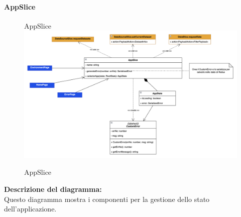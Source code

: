 \paragraph{AppSlice}
\begin{figure}[h!] \centering
AppSlice      \includegraphics[scale=0.4]{template/images/uml_front/logic/AppSlice.png}
      \caption{AppSlice}
\end{figure}
\textbf{Descrizione del diagramma:}\\
Questo diagramma mostra i componenti per la gestione dello stato dell'applicazione.
